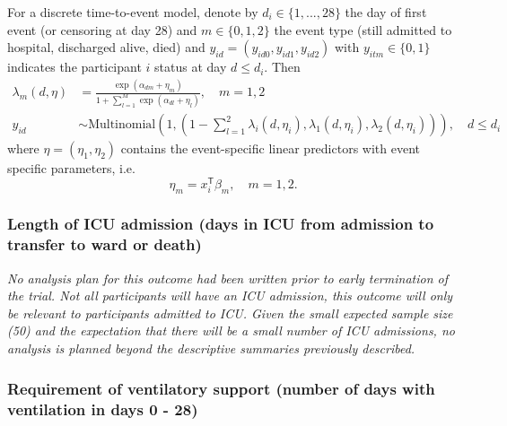 \documentclass[11pt,parskip=half-]{scrartcl}
\begin{document}
For a discrete time-to-event model, denote by $d_i\in\{1,...,28\}$ the day of first event (or censoring at day 28) and $m\in\{0,1,2\}$ the event type (still admitted to hospital, discharged alive, died) and $y_{id} = (y_{id0}, y_{id1}, y_{id2})$ with $y_{itm}\in\{0,1\}$ indicates the participant $i$ status at day $d\leq d_i$. Then
$$
\begin{aligned}
\lambda_m(d, \eta) &= \frac{\exp(\alpha_{dm} + \eta_m)}{1 + \sum_{l=1}^M \exp(\alpha_{dl} + \eta_l)},\quad m=1,2 \\
y_{id} &\sim \text{Multinomial}\left(1, \left(1 - \sum_{l=1}^2 \lambda_i(d,\eta_i), \lambda_1(d, \eta_i), \lambda_2(d, \eta_i)\right)\right),\quad d\leq d_i
\end{aligned}
$$
where $\eta=(\eta_1,\eta_2)$ contains the event-specific linear predictors with event specific parameters, i.e.
$$
\eta_m = x_i^\mathsf{T}\beta_m, \quad m = 1,2.
$$

\subsubsection{Length of ICU admission (days in ICU from admission to transfer to ward or death)}

\textit{No analysis plan for this outcome had been written prior to early termination of the trial. Not all participants will have an ICU admission, this outcome will only be relevant to participants admitted to ICU. Given the small expected sample size (50) and the expectation that there will be a small number of ICU admissions, no analysis is planned beyond the descriptive summaries previously described.}

\subsubsection{Requirement of ventilatory support (number of days with ventilation in days 0 - 28)}\label{sec:vent-support}
\end{document}
